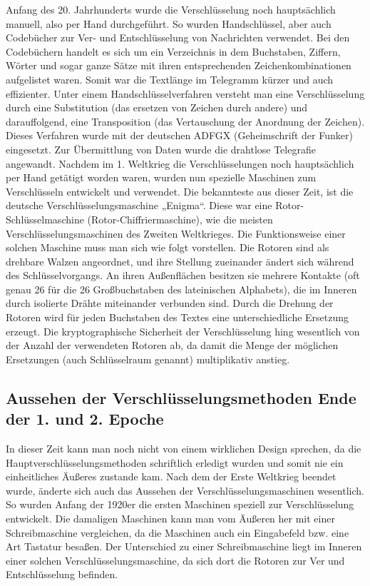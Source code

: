 Anfang des 20. Jahrhunderts wurde die Verschlüsselung noch hauptsächlich manuell, also per Hand durchgeführt. So wurden Handschlüssel, aber auch Codebücher zur Ver- und Entschlüsselung von Nachrichten verwendet. Bei den Codebüchern handelt es sich um ein Verzeichnis in dem Buchstaben, Ziffern, Wörter und sogar ganze Sätze mit ihren entsprechenden Zeichenkombinationen aufgelistet waren. Somit war die Textlänge im Telegramm kürzer und auch effizienter. Unter einem Handschlüsselverfahren versteht man eine Verschlüsselung durch eine Substitution (das ersetzen von Zeichen durch andere) und darauffolgend, eine Transposition (das Vertauschung der Anordnung der Zeichen). Dieses Verfahren wurde mit der deutschen ADFGX (Geheimschrift der Funker) eingesetzt. Zur Übermittlung von Daten wurde die drahtlose Telegrafie angewandt. Nachdem im 1. Weltkrieg die Verschlüsselungen noch hauptsächlich per Hand getätigt worden waren, wurden nun spezielle Maschinen zum Verschlüsseln entwickelt und verwendet. Die bekannteste aus dieser Zeit, ist die deutsche Verschlüsselungsmaschine „Enigma“. 
Diese war eine Rotor-Schlüsselmaschine (Rotor-Chiffriermaschine), wie die meisten Verschlüsselungsmaschinen des Zweiten Weltkrieges. Die Funktionsweise einer solchen Maschine muss man sich wie folgt vorstellen. Die Rotoren sind als drehbare Walzen angeordnet, und ihre Stellung zueinander ändert sich während des Schlüsselvorgangs. An ihren Außenflächen besitzen sie mehrere Kontakte (oft genau 26 für die 26 Großbuchstaben des lateinischen Alphabets), die im Inneren durch isolierte Drähte miteinander verbunden sind. Durch die Drehung der Rotoren wird für jeden Buchstaben des Textes eine unterschiedliche Ersetzung erzeugt. Die kryptographische Sicherheit der Verschlüsselung hing wesentlich von der Anzahl der verwendeten Rotoren ab, da damit die Menge der möglichen Ersetzungen (auch Schlüsselraum genannt) multiplikativ anstieg. 

\subsection{Aussehen der Verschlüsselungsmethoden Ende der 1. und 2. Epoche}

In dieser Zeit kann man noch nicht von einem wirklichen Design sprechen, da die Hauptverschlüsselungsmethoden schriftlich erledigt wurden und somit nie ein einheitliches Äußeres zustande kam. Nach dem der Erste Weltkrieg beendet wurde, änderte sich auch das Aussehen der Verschlüsselungsmaschinen wesentlich. So wurden Anfang der 1920er die ersten Maschinen speziell zur Verschlüsselung entwickelt. Die damaligen Maschinen kann man vom Äußeren her mit einer Schreibmaschine vergleichen, da die Maschinen auch ein Eingabefeld bzw. eine Art Tastatur besaßen. Der Unterschied zu einer Schreibmaschine liegt im Inneren einer solchen Verschlüsselungsmaschine, da sich dort die Rotoren zur Ver und Entschlüsselung befinden.\\

